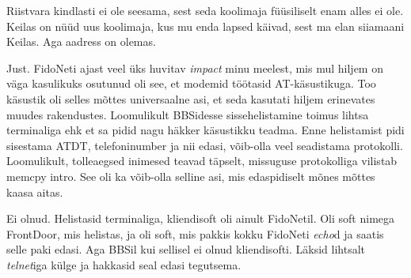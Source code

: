 
Riistvara kindlasti ei ole seesama, sest seda koolimaja füüsiliselt enam alles 
ei ole. Keilas on nüüd uus koolimaja, kus mu enda lapsed käivad, sest ma elan 
siiamaani Keilas. Aga aadress on olemas.


Just. FidoNeti ajast veel üks huvitav \emph{impact} minu meelest, mis mul  
hiljem on väga kasulikuks osutunud oli see, et modemid töötasid
AT-käsustikuga. 
Too käsustik oli selles mõttes universaalne asi, et seda kasutati hiljem 
erinevates muudes rakendustes. Loomulikult BBSidesse sissehelistamine toimus 
lihtsa terminaliga ehk et sa pidid nagu häkker käsustikku teadma. Enne 
helistamist pidi sisestama  ATDT, telefoninumber ja nii edasi, võib-olla veel 
seadistama protokolli. Loomulikult, tolleaegsed inimesed teavad täpselt, 
missuguse protokolliga vilistab  memcpy intro. See oli ka võib-olla selline 
asi, mis edaspidiselt  mõnes mõttes kaasa aitas.


Ei olnud. Helistasid terminaliga, kliendisoft oli ainult FidoNetil. Oli soft 
nimega FrontDoor, mis helistas, ja oli soft, mis pakkis kokku FidoNeti 
\emph{echo}d ja  saatis  selle paki edasi. Aga BBSil kui sellisel ei olnud 
kliendisofti. Läksid lihtsalt \emph{telnet}iga külge ja hakkasid seal edasi 
tegutsema.


